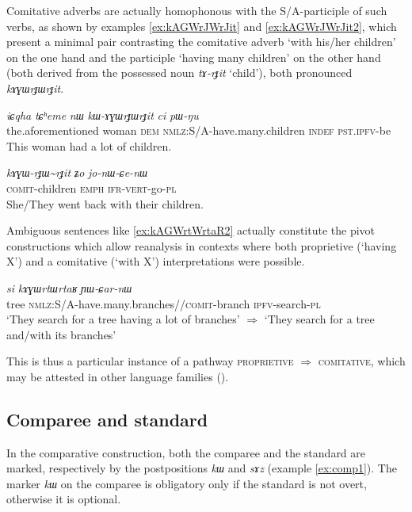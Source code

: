 \documentclass[oneside,a4paper,11pt]{article}
\newcommand{\ipa}[1]{\mbox{\phon\textit{#1}}} %
\newcommand{\tld}{\textasciitilde{}}
\begin{document}
Comitative adverbs are actually homophonous with the S/A-participle of such verbs, as shown by examples \ref{ex:kAGWrJWrJit} and \ref{ex:kAGWrJWrJit2}, which present a minimal pair contrasting the comitative adverb  `with his/her children' on the one hand and the participle  `having many children' on the other hand (both derived from the possessed noun  \ipa{tɤ-rɟit} `child'), both pronounced \ipa{kɤɣɯrɟɯrɟit}.

\begin{exe}
\ex \label{ex:kAGWrJWrJit}
\gll   
\ipa{iɕqha} 	\ipa{tɕʰeme} 	\ipa{nɯ} 	\ipa{kɯ-ɤɣɯrɟɯrɟit} 	\ipa{ci} 	\ipa{pɯ-ŋu}  \\
the.aforementioned woman \textsc{dem} \textsc{nmlz}:S/A-have.many.children \textsc{indef} \textsc{pst.ipfv}-be \\
\glt This woman had a lot of children.
\end{exe}

\begin{exe}
\ex \label{ex:kAGWrJWrJit2}
\gll   
\ipa{kɤɣɯ-rɟɯ\tld{}rɟit} 	\ipa{ʑo} 	\ipa{jo-nɯ-ɕe-nɯ} \\
\textsc{comit}-children \textsc{emph} \textsc{ifr-vert}-go-\textsc{pl} \\
\glt She/They went back with their children.
\end{exe}

Ambiguous sentences like \ref{ex:kAGWrtWrtaR2} actually constitute the pivot constructions which allow reanalysis in contexts where both proprietive (`having X') and a comitative (`with X') interpretations were possible.


  \begin{exe}
\ex \label{ex:kAGWrtWrtaR2}
\gll   
  \ipa{si} 	\ipa{kɤɣɯrtɯrtaʁ} \ipa{ɲɯ-ɕar-nɯ} \\
  tree \textsc{nmlz}:S/A-have.many.branches//\textsc{comit}-branch \textsc{ipfv}-search-\textsc{pl} \\
\glt `They search for a tree having a lot of branches' $\Rightarrow$ `They search for a tree and/with its branches'
\end{exe}

This is thus a particular instance of a pathway \textsc{proprietive} $\Rightarrow$ \textsc{comitative}, which may be attested in other language families (\citealt{stassen00and, stolz06comitative, arkhipov09comitative}).

\subsection{Comparee and standard}
In the comparative construction, both the comparee and the standard are marked, respectively by the postpositions \ipa{kɯ} and \ipa{sɤz}  (example \ref{ex:comp1}). The marker \ipa{kɯ} on the comparee is obligatory only if the standard is not overt, otherwise it is optional.
\end{document}
